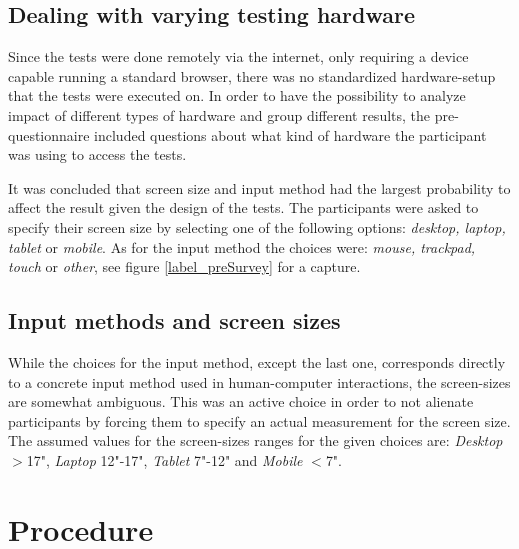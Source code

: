 \documentclass[nofilelist,dvipsnames]{cslthse-msc}
\begin{document}
{%

    \subsection{Dealing with varying testing hardware}

      Since the tests were done remotely via the internet, only requiring a
      device capable running a standard browser, there was no standardized
      hardware-setup that the tests were executed on. In order to have the
      possibility to analyze impact of different types of hardware and group
      different results, the pre-questionnaire included questions about what
      kind of hardware the participant was using to access the tests.

      It was concluded that screen size and input method had the largest
      probability to affect the result given the design of the tests.
      The participants were asked to specify their screen size by selecting one
      of the following options: \textit{desktop, laptop, tablet} or
      \textit{mobile}. As for the input method the choices were:
      \textit{mouse, trackpad, touch} or \textit{other}, see figure
      \ref{label_preSurvey} for a capture.

    \subsection{Input methods and screen sizes}

      While the choices for the input method, except the last one, corresponds
      directly to a concrete input method used in human-computer interactions,
      the screen-sizes are somewhat ambiguous. This was an active choice in
      order to not alienate participants by forcing them to specify an actual
      measurement for the screen size.
      The assumed values for the screen-sizes ranges for the given choices are:
      \textit{Desktop} $>$17",
      \textit{Laptop}  12"-17",
      \textit{Tablet}  7"-12" and
      \textit{Mobile}  $<$7".

    \section{Procedure}

}
\end{document}
